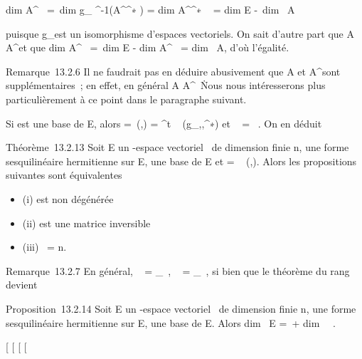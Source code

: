 \documentclass[]{article}
\begin{document}
dim A^\bot~ =\
dim g_ \phi^-1(A^\bot^∗ )
= dim A^\bot^∗ ~
= dim E -\ dim~ A

puisque g_\phi est un isomorphisme d'espaces vectoriels. On sait
d'autre part que A \subset~ A^\bot\bot et que
dim A^\bot\bot~ =\
dim E - dim A^\bot~
= dim~ A, d'où l'égalité.

Remarque~13.2.6 Il ne faudrait pas en déduire abusivement que A et
A^\bot sont supplémentaires~; en effet, en général A \bigcap
A^\bot\neq~\0\.
Nous nous intéresserons plus particulièrement à ce point dans le
paragraphe suivant.

Si  est une base de E, alors \Omega =\
\mathrmMat (\phi,) =
^t \mathrmMat~
(g_\phi,\mathcal{E},\mathcal{E}^∗) et
\mathrmrg~\phi
= \mathrmrg~\Omega. On en déduit

Théorème~13.2.13 Soit E un -espace vectoriel ~de dimension finie n, \phi
une forme sesquilinéaire hermitienne sur E,  une base de E et \Omega
= \mathrmMat~ (\phi,). Alors
les propositions suivantes sont équivalentes

\begin{itemize}
\itemsep1pt\parskip0pt
\item
  (i) \phi est non dégénérée
\item
  (ii) \Omega est une matrice inversible
\item
  (iii) \mathrmrg~\phi = n.
\end{itemize}

Remarque~13.2.7 En général,
\mathrmKer~\phi
= \mathrmKerg_\phi~,
\mathrmrg~\phi
= \mathrmrgg_\phi~, si
bien que le théorème du rang devient

Proposition~13.2.14 Soit E un -espace vectoriel ~de dimension finie n,
\phi une forme sesquilinéaire hermitienne sur E,  une base de E. Alors
dim~ E =\
\mathrmrg\phi + dim~
\mathrmKer~\phi.

{[}
{[}
{[}
{[}
\end{document}
